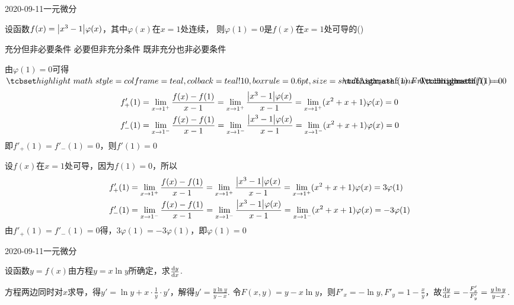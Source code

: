 \documentclass{ctexart}
\begin{document}
\begin{mathques}{2020-09-11}{一元微分}
\begin{ques}
  设函数$f(x) = \abs{x^3 - 1}\varphi (x)$，其中$\varphi (x) $在$x = 1$处连续，
  则$\varphi (1) = 0$是$f(x)$在$x = 1$处可导的(\quad)
  \begin{multichoice}
    \task {}
    \task 充分但非必要条件
    \task 必要但非充分条件
    \task 既非充分也非必要条件
  \end{multichoice}
\end{ques}
\begin{solu}
  \par
  由$\varphi(1) = 0$可得$\mathhint{f(1) = 0}$
  \begin{align*}
    f'_+(1) &= \lim_{x \to 1^+} \frac{f(x) - f(1)}{x - 1}
    = \lim_{x \to 1^+} \frac{\abs{x^3 - 1}\varphi(x)}{x - 1}
    = \lim_{x \to 1^+} (x^2 + x + 1)\varphi(x) = 0\\
    f'_-(1) &= \lim_{x \to 1^-} \frac{f(x) - f(1)}{x - 1}
    = \lim_{x \to 1^-} \frac{\abs{x^3 - 1}\varphi(x)}{x - 1}
    = \lim_{x \to 1^-} (x^2 + x + 1)\varphi(x) = 0
  \end{align*}
  即$f'_+(1) = f'_-(1) = 0$，则$f'(1) = 0$

  \par
  设$f(x)$在$x = 1$处可导，因为$f(1) = 0$，所以
  \begin{align*}
    f'_+(1) &= \lim_{x \to 1^+} \frac{f(x) - f(1)}{x - 1}
    = \lim_{x \to 1^+} \frac{\abs{x^3 - 1}\varphi(x)}{x - 1}
    = \lim_{x \to 1^+} (x^2 + x + 1)\varphi(x) = 3\varphi(1)\\
    f'_-(1) &= \lim_{x \to 1^-} \frac{f(x) - f(1)}{x - 1}
    = \lim_{x \to 1^-} \frac{\abs{x^3 - 1}\varphi(x)}{x - 1}
    = \lim_{x \to 1^-} (x^2 + x + 1)\varphi(x) = -3\varphi(1)
  \end{align*}
  由$f'_+(1) = f'_-(1) = 0$得，$3\varphi(1) = -3\varphi(1)$，即$\varphi(1) = 0$
\end{solu}
\end{mathques}

\begin{mathques}{2020-09-11}{一元微分}
\begin{ques}
  设函数$y = f(x)$由方程$y = x\ln y$所确定，求$\dv{y}{x}$.
\end{ques}
\begin{solu}
\mathmethod 方程两边同时对$x$求导，得$y' = \ln y + x\cdot \frac{1}{y} \cdot
y'$，解得$y' = \frac{y \ln y}{y - x}$.
\mathmethod 令$F(x, y) = y - x\ln y$，则$F'_x = - \ln y, F'_y = 1 - \frac{x}{y}
$，故$\dv{y}{x} = - \frac{F'_x}{F'_y} = \frac{y\ln y}{y - x}$.
\end{solu}
\end{mathques}
\end{document}
